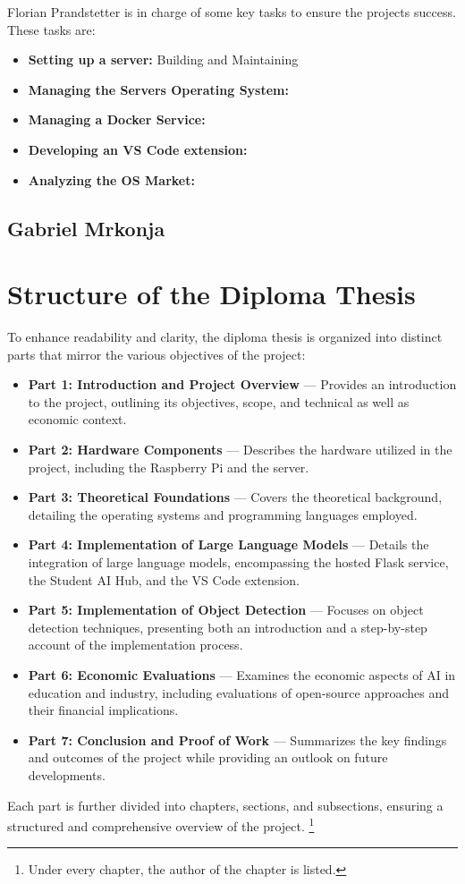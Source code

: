 Florian Prandstetter is in charge of some key tasks to ensure the projects success.
These tasks are:

\begin{itemize}
    \item \textbf{Setting up a server:} Building and Maintaining
    \item \textbf{Managing the Servers Operating System:} 
    \item \textbf{Managing a Docker Service:} 
    \item \textbf{Developing an VS Code extension:} 
    \item \textbf{Analyzing the OS Market:} 
\end{itemize}

\subsection{Gabriel Mrkonja}


\section{Structure of the Diploma Thesis}

To enhance readability and clarity, the diploma thesis is organized into distinct parts that mirror the various objectives of the project:

\begin{itemize}
    \item \textbf{Part 1: Introduction and Project Overview} — Provides an introduction to the project, outlining its objectives, scope, and technical as well as economic context.
    \item \textbf{Part 2: Hardware Components} — Describes the hardware utilized in the project, including the Raspberry Pi and the server.
    \item \textbf{Part 3: Theoretical Foundations} — Covers the theoretical background, detailing the operating systems and programming languages employed.
    \item \textbf{Part 4: Implementation of Large Language Models} — Details the integration of large language models, encompassing the hosted Flask service, the Student AI Hub, and the VS Code extension.
    \item \textbf{Part 5: Implementation of Object Detection} — Focuses on object detection techniques, presenting both an introduction and a step-by-step account of the implementation process.
    \item \textbf{Part 6: Economic Evaluations} — Examines the economic aspects of AI in education and industry, including evaluations of open-source approaches and their financial implications.
    \item \textbf{Part 7: Conclusion and Proof of Work} — Summarizes the key findings and outcomes of the project while providing an outlook on future developments.
\end{itemize}

Each part is further divided into chapters, sections, and subsections, ensuring a structured and comprehensive overview of the project.
\footnote{Under every chapter, the author of the chapter is listed.}

